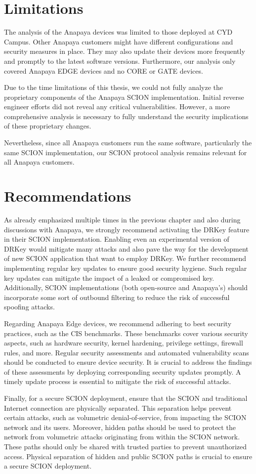 \section{Limitations}
The analysis of the Anapaya devices was limited to those deployed at CYD Campus.
Other Anapaya customers might have different configurations and security measures in place.
They may also update their devices more frequently and promptly to the latest software versions.
Furthermore, our analysis only covered Anapaya EDGE devices and no CORE or GATE devices.

Due to the time limitations of this thesis, we could not fully analyze the proprietary components of the Anapaya SCION implementation.
Initial reverse engineer efforts did not reveal any critical vulnerabilities.
However, a more comprehensive analysis is necessary to fully understand the security implications of these proprietary changes.

Nevertheless, since all Anapaya customers run the same software, particularly the same SCION implementation, our SCION protocol analysis remains relevant for all Anapaya customers.


\section{Recommendations}

As already emphasized multiple times in the previous chapter and also during discussions with Anapaya, we strongly recommend activating the DRKey feature in their SCION implementation.
Enabling even an experimental version of DRKey would mitigate many attacks and also pave the way for the development of new SCION application that want to employ DRKey.
We further recommend implementing regular key updates to ensure good security hygiene.
Such regular key updates can mitigate the impact of a leaked or compromised key.
Additionally, SCION implementations (both open-source and Anapaya's) should incorporate some sort of outbound filtering to reduce the risk of successful spoofing attacks.

Regarding Anapaya Edge devices, we recommend adhering to best security practices, such as the CIS benchmarks.
These benchmarks cover various security aspects, such as hardware security, kernel hardening, privilege settings, firewall rules, and more.
Regular security assessments and automated vulnerability scans should be conducted to ensure device security.
It is crucial to address the findings of these assessments by deploying corresponding security updates promptly.
A timely update process is essential to mitigate the risk of successful attacks.

Finally, for a secure SCION deployment, ensure that the SCION and traditional Internet connection are physically separated.
This separation helps prevent certain attacks, such as volumetric denial-of-service, from impacting the SCION network and its users.
Moreover, hidden paths should be used to protect the network from volumetric attacks originating from within the SCION network.
These paths should only be shared with trusted parties to prevent unauthorized access.
Physical separation of hidden and public SCION paths is crucial to ensure a secure SCION deployment.


